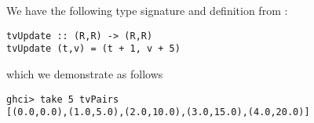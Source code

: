 
We have the following type signature and definition from :
\begin{verbatim}
tvUpdate :: (R,R) -> (R,R)
tvUpdate (t,v) = (t + 1, v + 5)
\end{verbatim}
which we demonstrate as follows
\begin{verbatim}
ghci> take 5 tvPairs
[(0.0,0.0),(1.0,5.0),(2.0,10.0),(3.0,15.0),(4.0,20.0)]
\end{verbatim}
